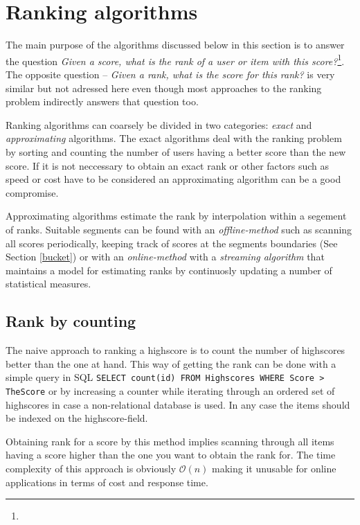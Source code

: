 \chapter{\label{ranking-algorithms}Ranking algorithms}

The main purpose of the algorithms discussed below in this section is to answer the question \emph{Given a score, what is the rank of a user or item with this score?}\footnote{}. The opposite question -- \emph{Given a rank, what is the score for this rank?} is very similar but not adressed here even though most approaches to the ranking problem indirectly answers that question too.

Ranking algorithms can coarsely be divided in two categories: \emph{exact} and \emph{approximating} algorithms. The exact algorithms deal with the ranking problem by sorting and counting the number of users having a better score than the new score. If it is not neccessary to obtain an exact rank or other factors such as speed or cost have to be considered an approximating algorithm can be a good compromise.

Approximating algorithms estimate the rank by interpolation within a segement of ranks. Suitable segments can be found with an \emph{offline-method} such as scanning all scores periodically, keeping track of scores at the segments boundaries (See Section \ref{bucket}) or with an \emph{online-method} with a \emph{streaming algorithm} that maintains a model for estimating ranks by continuosly updating a number of statistical measures.

\section{\label{counting}Rank by counting}

The naive approach to ranking a highscore is to count the number of highscores better than the one at hand. This way of getting the rank can be done with a simple query in SQL
\texttt{SELECT count(id) FROM Highscores WHERE Score > TheScore} or by increasing a counter while iterating through an ordered set of highscores in case a non-relational database is used. In any case the items should be indexed on the highscore-field.

Obtaining rank for a score by this method implies scanning through all items having a score higher than the one you want to obtain the rank for. The time complexity of this approach is obviously $\mathcal{O}(n)$ making it unusable for online applications in terms of cost and response time.

